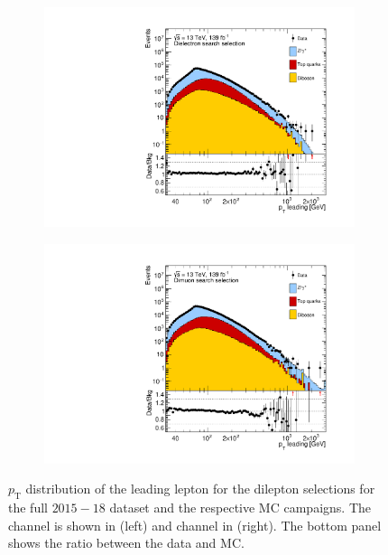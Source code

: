\begin{figure}[]
    \centering
    \begin{subfigure}[b]{0.49\textwidth}
        \centering
        \includegraphics[width=\textwidth]{figures/analysis/datamc/dataMCcompare/ee_pt1_log100.pdf}
        \label{fig:datamc:eept1}
    \end{subfigure}
    \begin{subfigure}[b]{0.49\textwidth}
        \centering
        \includegraphics[width=\textwidth]{figures/analysis/datamc/dataMCcompare/uu_pt1_log100.pdf}
        \label{fig:datamc:uupt1}
    \end{subfigure}
    \caption[$p_\mathrm{T}$ distribution of the leading lepton for the dilepton selections for the full $2015-18$ dataset and the respective MC campaigns.]{$p_\mathrm{T}$ distribution of the leading lepton for the dilepton selections for the full $2015-18$ dataset and the respective MC campaigns. The \ee channel is shown in (left) and \mumu channel in (right). The bottom panel shows the ratio between the data and MC.}
    \label{fig:datamc:pt1}
\end{figure}

